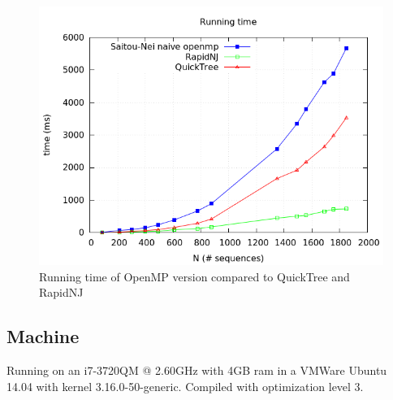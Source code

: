 \documentclass[a4paper,oneside,article,11pt]{memoir}
\begin{document}
\begin{figure}[H]
\includegraphics[scale=0.5]{../results/running_time_all.png}
\caption{\label{fig:openmp}Running time of OpenMP version compared to QuickTree and RapidNJ}
\end{figure}

\subsection*{Machine}
Running on an i7-3720QM @ 2.60GHz with 4GB ram in a VMWare Ubuntu 14.04 with kernel 3.16.0-50-generic. Compiled with optimization level 3.
\end{document}
